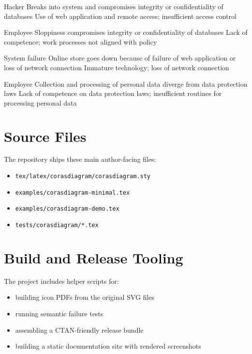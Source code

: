 \documentclass[a4paper]{article}
\begin{document}
\begingroup
\small
\begin{corashighlevelanalysistable}[
  caption={Documenting the high-level analysis}
]
  \corashighlevelanalysisrow
    {Hacker}
    {Breaks into system and compromises integrity or confidentiality of databases}
    {Use of web application and remote access; insufficient access control}

  \corashighlevelanalysisrow
    {Employee}
    {Sloppiness compromises integrity or confidentiality of databases}
    {Lack of competence; work processes not aligned with policy}

  \corashighlevelanalysisrow
    {System failure}
    {Online store goes down because of failure of web application or loss of network connection}
    {Immature technology; loss of network connection}

  \corashighlevelanalysisrow
    {Employee}
    {Collection and processing of personal data diverge from data protection laws}
    {Lack of competence on data protection laws; insufficient routines for processing personal data}
\end{corashighlevelanalysistable}
\endgroup

\section{Source Files}

The repository ships these main author-facing files:

\begin{itemize}
  \item \texttt{tex/latex/corasdiagram/corasdiagram.sty}
  \item \texttt{examples/corasdiagram-minimal.tex}
  \item \texttt{examples/corasdiagram-demo.tex}
  \item \texttt{tests/corasdiagram/*.tex}
\end{itemize}

\section{Build and Release Tooling}

The project includes helper scripts for:

\begin{itemize}
  \item building icon PDFs from the original SVG files
  \item running semantic failure tests
  \item assembling a CTAN-friendly release bundle
  \item building a static documentation site with rendered screenshots
\end{itemize}
\end{document}
